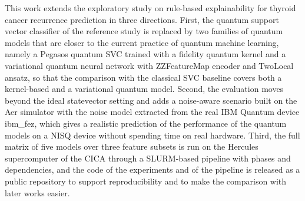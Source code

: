 
This work extends the exploratory study on rule-based explainability for thyroid cancer recurrence prediction in three directions. First, the quantum support vector classifier of the reference study is replaced by two families of quantum models that are closer to the current practice of quantum machine learning, namely a Pegasos quantum SVC trained with a fidelity quantum kernel and a variational quantum neural network with ZZFeatureMap encoder and TwoLocal ansatz, so that the comparison with the classical SVC baseline covers both a kernel-based and a variational quantum model. Second, the evaluation moves beyond the ideal statevector setting and adds a noise-aware scenario built on the Aer simulator with the noise model extracted from the real IBM Quantum device ibm\_fez, which gives a realistic prediction of the performance of the quantum models on a NISQ device without spending time on real hardware. Third, the full matrix of five models over three feature subsets is run on the Hercules supercomputer of the CICA through a SLURM-based pipeline with phases and dependencies, and the code of the experiments and of the pipeline is released as a public repository to support reproducibility and to make the comparison with later works easier.
